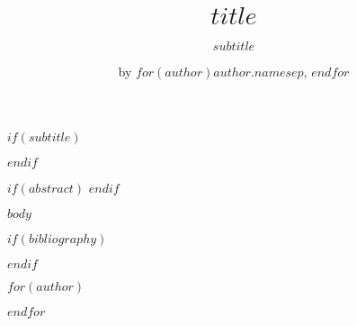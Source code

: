 \title{$title$}

$if(subtitle)$
\subtitle{%
$subtitle$
}
$endif$

\author{by $for(author)$$author.name$$sep$, $endfor$}

\maketitle

$if(abstract)$
$endif$

$body$

$if(bibliography)$

$endif$

$for(author)$
\address{%
$author.name$\\
$author.affiliation$\\%
$for(author.address)$$author.address$$sep$\\ $endfor$\\
$if(author.affiliation2)$
$author.affiliation2$\\%
$for(author.address2)$$author.address2$$sep$\\ $endfor$\\
$endif$%
$if(author.url)$$author.url$\\$endif$%
$if(author.orcid)$\textit{ORCiD: \href{https://orcid.org/$author.orcid$}{$author.orcid$}}\\$endif$%
$if(author.email)$$author.email$$endif$%
}

$endfor$
